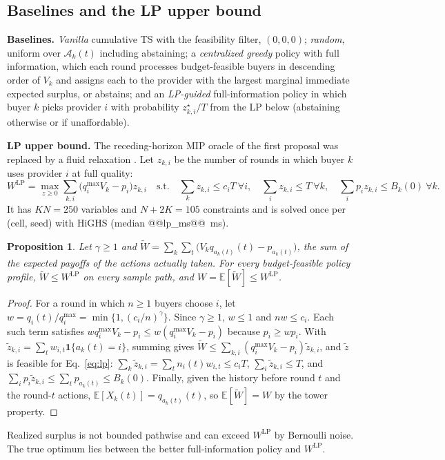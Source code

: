 \documentclass{article}
\newtheorem{proposition}{Proposition}
\newcommand{\WLP}{W^{\mathrm{LP}}}
\begin{document}
\subsection{Baselines and the LP upper bound}
\textbf{Baselines.} \emph{Vanilla} cumulative TS with the feasibility filter, $(0,0,0)$; \emph{random}, uniform over $\mathcal A_k(t)$ including abstaining; a \emph{centralized greedy} policy with full information, which each round processes budget-feasible buyers in descending order of $V_k$ and assigns each to the provider with the largest marginal immediate expected surplus, or abstains; and an \emph{LP-guided} full-information policy in which buyer $k$ picks provider $i$ with probability $z^\star_{k,i}/T$ from the LP below (abstaining otherwise or if unaffordable).

\textbf{LP upper bound.} The receding-horizon MIP oracle of the first proposal was replaced by a fluid relaxation \cite{badanidiyuru2013}. Let $z_{k,i}$ be the number of rounds in which buyer $k$ uses provider $i$ at full quality:
\begin{equation}
\WLP=\max_{z\ge0}\sum_{k,i}\big(q_i^{\max}V_k-p_i\big)z_{k,i}\quad\text{s.t.}\quad\sum_kz_{k,i}\le c_iT\ \forall i,\quad\sum_iz_{k,i}\le T\ \forall k,\quad\sum_ip_iz_{k,i}\le B_k(0)\ \forall k.
\label{eq:lp}
\end{equation}
It has $KN=250$ variables and $N+2K=105$ constraints and is solved once per (cell, seed) with HiGHS (median @@lp_ms@@~ms).

\begin{proposition}
\label{prop:lp}
Let $\gamma\ge1$ and $\widetilde W=\sum_k\sum_t\big(V_kq_{a_k(t)}(t)-p_{a_k(t)}\big)$, the sum of the expected payoffs of the actions actually taken. For every budget-feasible policy profile, $\widetilde W\le\WLP$ on every sample path, and $W=\mathbb E[\widetilde W]\le\WLP$.
\end{proposition}
\begin{proof}
For a round in which $n\ge1$ buyers choose $i$, let $w=q_i(t)/q_i^{\max}=\min\{1,(c_i/n)^\gamma\}$. Since $\gamma\ge1$, $w\le1$ and $nw\le c_i$. Each such term satisfies $wq_i^{\max}V_k-p_i\le w(q_i^{\max}V_k-p_i)$ because $p_i\ge wp_i$. With $\tilde z_{k,i}=\sum_tw_{i,t}\mathbf 1\{a_k(t)=i\}$, summing gives $\widetilde W\le\sum_{k,i}(q_i^{\max}V_k-p_i)\tilde z_{k,i}$, and $\tilde z$ is feasible for Eq.~\eqref{eq:lp}: $\sum_k\tilde z_{k,i}=\sum_tn_i(t)w_{i,t}\le c_iT$, $\sum_i\tilde z_{k,i}\le T$, and $\sum_ip_i\tilde z_{k,i}\le\sum_tp_{a_k(t)}\le B_k(0)$. Finally, given the history before round $t$ and the round-$t$ actions, $\mathbb E[X_k(t)]=q_{a_k(t)}(t)$, so $\mathbb E[\widetilde W]=W$ by the tower property.
\end{proof}
Realized surplus is not bounded pathwise and can exceed $\WLP$ by Bernoulli noise. The true optimum lies between the better full-information policy and $\WLP$.
\end{document}
